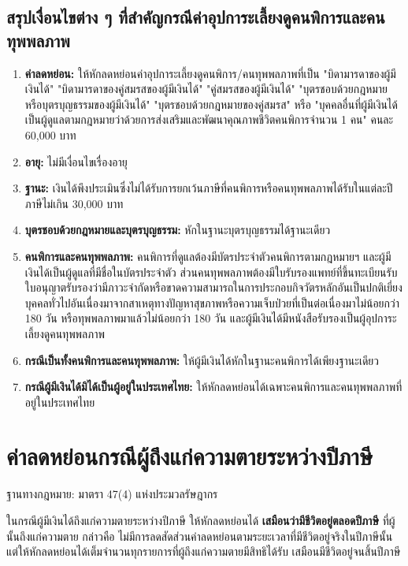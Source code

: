 \documentclass[12pt,a4paper]{article}
\newcommand{\hilight}[1]{\textbf{#1}}
\begin{document}
\subsection*{สรุปเงื่อนไขต่าง ๆ ที่สำคัญกรณีค่าอุปการะเลี้ยงดูคนพิการและคนทุพพลภาพ}

\begin{enumerate}
    \item \textbf{ค่าลดหย่อน:} ให้หักลดหย่อนค่าอุปการะเลี้ยงดูคนพิการ/คนทุพพลภาพที่เป็น "บิดามารดาของผู้มีเงินได้" "บิดามารดาของคู่สมรสของผู้มีเงินได้" "คู่สมรสของผู้มีเงินได้" "บุตรชอบด้วยกฎหมายหรือบุตรบุญธรรมของผู้มีเงินได้" "บุตรชอบด้วยกฎหมายของคู่สมรส" หรือ "บุคคลอื่นที่ผู้มีเงินได้เป็นผู้ดูแลตามกฎหมายว่าด้วยการส่งเสริมและพัฒนาคุณภาพชีวิตคนพิการจำนวน 1 คน" คนละ 60,000 บาท
    \item \textbf{อายุ:} ไม่มีเงื่อนไขเรื่องอายุ
    \item \textbf{ฐานะ:} เงินได้พึงประเมินซึ่งไม่ได้รับการยกเว้นภาษีที่คนพิการหรือคนทุพพลภาพได้รับในแต่ละปีภาษีไม่เกิน 30,000 บาท
    \item \textbf{บุตรชอบด้วยกฎหมายและบุตรบุญธรรม:} หักในฐานะบุตรบุญธรรมได้ฐานะเดียว
    \item \textbf{คนพิการและคนทุพพลภาพ:} คนพิการที่ดูแลต้องมีบัตรประจำตัวคนพิการตามกฎหมายฯ และผู้มีเงินได้เป็นผู้ดูแลที่มีชื่อในบัตรประจำตัว ส่วนคนทุพพลภาพต้องมีใบรับรองแพทย์ที่ขึ้นทะเบียนรับใบอนุญาตรับรองว่ามีภาวะจำกัดหรือขาดความสามารถในการประกอบกิจวัตรหลักอันเป็นปกติเยี่ยงบุคคลทั่วไปอันเนื่องมาจากสาเหตุทางปัญหาสุขภาพหรือความเจ็บป่วยที่เป็นต่อเนื่องมาไม่น้อยกว่า 180 วัน หรือทุพพลภาพมาแล้วไม่น้อยกว่า 180 วัน และผู้มีเงินได้มีหนังสือรับรองเป็นผู้อุปการะเลี้ยงดูคนทุพพลภาพ
    \item \textbf{กรณีเป็นทั้งคนพิการและคนทุพพลภาพ:} ให้ผู้มีเงินได้หักในฐานะคนพิการได้เพียงฐานะเดียว
    \item \textbf{กรณีผู้มีเงินได้มิได้เป็นผู้อยู่ในประเทศไทย:} ให้หักลดหย่อนได้เฉพาะคนพิการและคนทุพพลภาพที่อยู่ในประเทศไทย
\end{enumerate}

\newpage
\section{ค่าลดหย่อนกรณีผู้ถึงแก่ความตายระหว่างปีภาษี}

ฐานทางกฎหมาย: มาตรา 47(4) แห่งประมวลรัษฎากร

ในกรณีผู้มีเงินได้ถึงแก่ความตายระหว่างปีภาษี ให้หักลดหย่อนได้ \hilight{เสมือนว่ามีชีวิตอยู่ตลอดปีภาษี} ที่ผู้นั้นถึงแก่ความตาย กล่าวคือ ไม่มีการลดสัดส่วนค่าลดหย่อนตามระยะเวลาที่มีชีวิตอยู่จริงในปีภาษีนั้น แต่ให้หักลดหย่อนได้เต็มจำนวนทุกรายการที่ผู้ถึงแก่ความตายมีสิทธิได้รับ เสมือนมีชีวิตอยู่จนสิ้นปีภาษี
\end{document}
